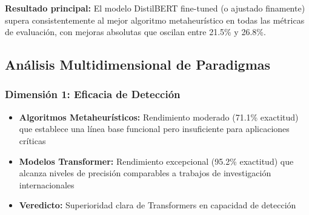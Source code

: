 \begin{table}[htbp]
\centering
{}
\caption{Comparación cuantitativa final entre el mejor algoritmo metaheurístico y el modelo Transformer optimizado.}
\label{tab:comparacion_final_paradigmas}
\end{table}

\textbf{Resultado principal:} El modelo DistilBERT fine-tuned (o ajustado finamente) supera consistentemente al mejor algoritmo metaheurístico en todas las métricas de evaluación, con mejoras absolutas que oscilan entre 21.5\% y 26.8\%.

\subsection{Análisis Multidimensional de Paradigmas}

\subsubsection{Dimensión 1: Eficacia de Detección}

\begin{itemize}
    \item \textbf{Algoritmos Metaheurísticos:} Rendimiento moderado (71.1\% exactitud) que establece una línea base funcional pero insuficiente para aplicaciones críticas
    \item \textbf{Modelos Transformer:} Rendimiento excepcional (95.2\% exactitud) que alcanza niveles de precisión comparables a trabajos de investigación internacionales
    \item \textbf{Veredicto:} Superioridad clara de Transformers en capacidad de detección
\end{itemize}

